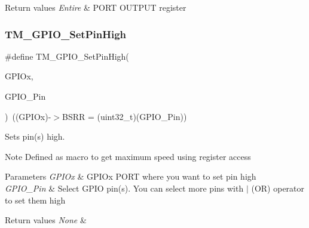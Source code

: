 \begin{DoxyRetVals}{Return values}
{\em Entire} & P\+O\+RT O\+U\+T\+P\+UT register \\
\hline
\end{DoxyRetVals}
\mbox{\label{group___t_m___g_p_i_o___functions_gac5aa8fbc39ed67f47972097fb7c8d69d}} 
\subsubsection{\texorpdfstring{T\+M\+\_\+\+G\+P\+I\+O\+\_\+\+Set\+Pin\+High}{TM\_GPIO\_SetPinHigh}}
{\footnotesize\ttfamily \#define T\+M\+\_\+\+G\+P\+I\+O\+\_\+\+Set\+Pin\+High(\begin{DoxyParamCaption}\item[{}]{G\+P\+I\+Ox,  }\item[{}]{G\+P\+I\+O\+\_\+\+Pin }\end{DoxyParamCaption})~((G\+P\+I\+Ox)-\/$>$B\+S\+RR = (uint32\+\_\+t)(G\+P\+I\+O\+\_\+\+Pin))}



Sets pin(s) high. 

\begin{DoxyNote}{Note}
Defined as macro to get maximum speed using register access 
\end{DoxyNote}

\begin{DoxyParams}{Parameters}
{\em G\+P\+I\+Ox} & G\+P\+I\+Ox P\+O\+RT where you want to set pin high \\
\hline
{\em G\+P\+I\+O\+\_\+\+Pin} & Select G\+P\+IO pin(s). You can select more pins with $\vert$ (OR) operator to set them high \\
\hline
\end{DoxyParams}

\begin{DoxyRetVals}{Return values}
{\em None} & \\
\hline
\end{DoxyRetVals}
\mbox{\label{group___t_m___g_p_i_o___functions_gaccceda87ce348c73b43780fdfed048d3}} 
